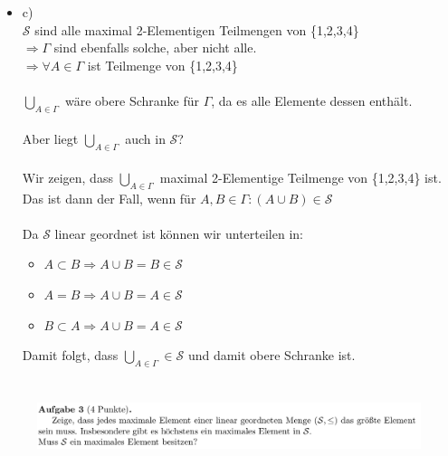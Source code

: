 \documentclass[a4paper]{scrartcl}
\begin{document}
\begin{itemize}
        \item c)\\
            $\mathcal{S}$ sind alle maximal 2-Elementigen Teilmengen von \{1,2,3,4\}\\
            $\Rightarrow \Gamma$ sind ebenfalls solche, aber nicht alle.\\
            $\Rightarrow \forall A \in \Gamma$ ist Teilmenge von \{1,2,3,4\}\\
            \\$\bigcup_{A \in \Gamma}$ wäre obere Schranke für $\Gamma$, da es alle Elemente dessen enthält.\\
            \\Aber liegt $\bigcup_{A \in \Gamma}$ auch in $\mathcal{S}$?\\
            \\Wir zeigen, dass $\bigcup_{A \in \Gamma}$ maximal 2-Elementige Teilmenge von \{1,2,3,4\} ist.\\
            Das ist dann der Fall, wenn für $A,B \in \Gamma: (A \cup B) \in \mathcal{S}$\\
            \\Da $\mathcal{S}$ linear geordnet ist können wir unterteilen in:\\
            \begin{itemize}
                \item $A \subset B \Rightarrow A \cup B = B \in \mathcal{S}$\\
                \item $A = B \Rightarrow A \cup B = A \in \mathcal{S}$\\
                \item $B \subset A \Rightarrow A \cup B = A \in \mathcal{S}$\\
            \end{itemize}
            Damit folgt, dass $\bigcup_{A \in \Gamma} \in \mathcal{S}$ und damit obere Schranke ist.\\
            





    \end{itemize}


\section*{}%
\label{sec:aufgabe_3}

    \begin{figure}[H]
        \centering
        \includegraphics[scale=0.3]{./A-3.png}
        \label{fig:}
    \end{figure}
\end{document}
